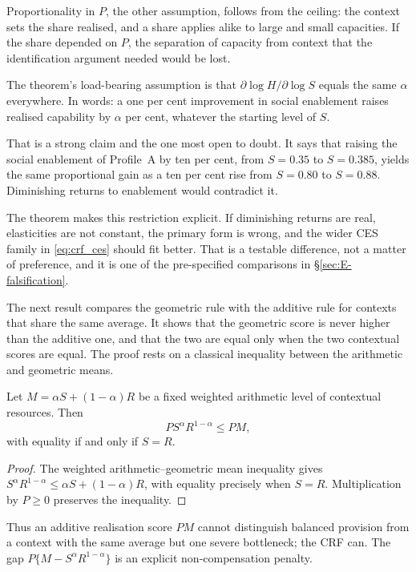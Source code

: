Proportionality in $P$, the other assumption, follows from the ceiling: the
context sets the share realised, and a share applies alike to large and small
capacities. If the share depended on $P$, the separation of capacity from
context that the identification argument needed would be lost.

\begin{reading}
The theorem's load-bearing assumption is that
$\partial\log H/\partial\log S$ equals the same $\alpha$ everywhere. In words:
a one per cent improvement in social enablement raises realised capability by
$\alpha$ per cent, whatever the starting level of $S$.

That is a strong claim and the one most open to doubt. It says that raising the
social enablement of Profile~A by ten per cent, from $S=0.35$ to $S=0.385$,
yields the same proportional gain as a ten per cent rise from $S=0.80$ to
$S=0.88$. Diminishing returns to enablement would contradict it.

The theorem makes this restriction explicit. If diminishing returns are
real, elasticities are not constant, the primary form is wrong, and the wider
CES family in \eqref{eq:crf_ces} should fit better. That is a testable
difference, not a matter of preference, and it is one of the pre-specified
comparisons in \S\ref{sec:E-falsification}.
\end{reading}

The next result compares the geometric rule with the additive rule for
contexts that share the same average. It shows that the geometric score is never
higher than the additive one, and that the two are equal only when the two
contextual scores are equal. The proof rests on a classical inequality between
the arithmetic and geometric means.

\begin{proposition}
\label{prop:crf_balance}
Let $M=\alpha S+(1-\alpha)R$ be a fixed weighted arithmetic level of contextual
resources. Then
\[
 PS^{\alpha}R^{1-\alpha}\leq PM,
\]
with equality if and only if $S=R$.
\end{proposition}
\begin{proof}
The weighted arithmetic--geometric mean \citep{hardy_littlewood_polya_1934} inequality gives
$S^{\alpha}R^{1-\alpha}\leq\alpha S+(1-\alpha)R$, with equality precisely when
$S=R$. Multiplication by $P\geq0$ preserves the inequality.
\end{proof}
Thus an additive realisation score $PM$ cannot distinguish balanced provision
from a context with the same average but one severe bottleneck; the CRF can. The
gap $P\{M-S^{\alpha}R^{1-\alpha}\}$ is an explicit non-compensation penalty.

